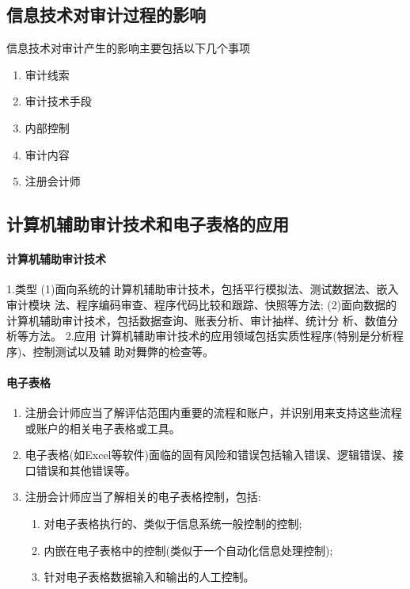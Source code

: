 \documentclass[UTF8,12pt]{ctexart}
\numberwithin{equation}{section} %
\numberwithin{figure}{section}
\numberwithin{table}{section}
\begin{document}
	\subsection{信息技术对审计过程的影响}
	信息技术对审计产生的影响主要包括以下几个事项
	\begin{enumerate}
		\item 审计线索
		
		\item 审计技术手段
		
		\item 内部控制
		
		\item 审计内容
		
		\item 注册会计师
	\end{enumerate}
	
	\subsection{计算机辅助审计技术和电子表格的应用}
	\paragraph{计算机辅助审计技术}
	1.类型
	(1)面向系统的计算机辅助审计技术，包括平行模拟法、测试数据法、嵌入审计模块 法、程序编码审查、程序代码比较和跟踪、快照等方法;
	(2)面向数据的计算机辅助审计技术，包括数据查询、账表分析、审计抽样、统计分 析、数值分析等方法。
	2.应用
	计算机辅助审计技术的应用领域包括实质性程序(特别是分析程序)、控制测试以及辅 助对舞弊的检查等。
	
	\paragraph{电子表格}
	\begin{enumerate}
		\item 注册会计师应当了解评估范围内重要的流程和账户，并识别用来支持这些流程或账户的相关电子表格或工具。
		
		\item 电子表格(如Excel等软件)面临的固有风险和错误包括输入错误、逻辑错误、接口错误和其他错误等。
		
		\item 注册会计师应当了解相关的电子表格控制，包括: 
		\begin{enumerate}
			\item 对电子表格执行的、类似于信息系统一般控制的控制; 
			
			\item 内嵌在电子表格中的控制(类似于一个自动化信息处理控制); 
			
			\item 针对电子表格数据输入和输出的人工控制。
		\end{enumerate}
	\end{enumerate}
	
\end{document}
